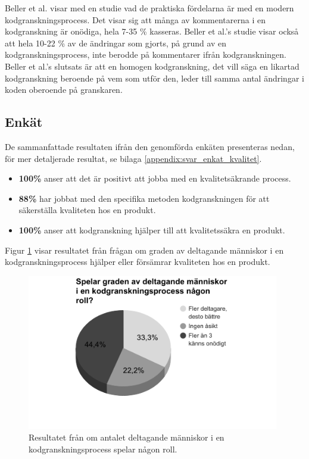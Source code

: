 Beller et al. \cite{beller2014modern} visar med en studie vad de praktiska fördelarna är med en modern kodgranskningsprocess. Det visar sig att många av kommentarerna i en kodgranskning är onödiga, hela 7-35 \% kasseras. Beller et al.'s \cite{beller2014modern} studie visar också att hela 10-22 \% av de ändringar som gjorts, på grund av en kodgranskningsprocess, inte berodde på kommentarer ifrån kodgranskningen. Beller et al.'s \cite{beller2014modern} slutsats är att en homogen kodgranskning, det vill säga en likartad kodgranskning beroende på vem som utför den, leder till samma antal ändringar i koden oberoende på granskaren.

\subsection{Enkät}
De sammanfattade resultaten ifrån den genomförda enkäten presenteras nedan, för mer detaljerade resultat, se bilaga \ref{appendix:svar_enkat_kvalitet}.
\begin{itemize}
	\item \textbf{100\%} anser att det är positivt att jobba med en kvalitetsäkrande process.
	\item \textbf{88\%} har jobbat med den specifika metoden kodgranskningen för att säkerställa kvaliteten hos en produkt.
	\item \textbf{100\%} anser att kodgranskning hjälper till att kvalitetssäkra en produkt.
\end{itemize}
Figur \ref{fig:grade_participation} visar resultatet från frågan om graden av deltagande människor i en kodgranskningsprocess hjälper eller försämrar kvaliteten hos en produkt.

\begin{figure}[H]
	\centering
	\includegraphics[width=110mm]{figures/grade_participation.png}
	\caption{Resultatet från om antalet deltagande människor i en kodgranskningsprocess spelar någon roll.}
	\label{fig:grade_participation}
\end{figure}

